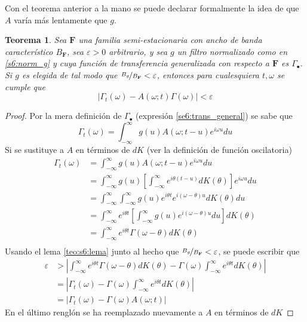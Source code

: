 \documentclass[12pt,letterpaper]{book}
\newtheorem{teorema}{Teorema}[chapter]
\newcommand{\intR}{\int_{-\infty}^{\infty}}
\newcommand{\ef}{\mathbf{F}}
\newcommand{\abso}[1]{\left| #1 \right|}
\begin{document}
Con el teorema anterior a la mano se puede declarar formalmente la idea de que $A$ varía más lentamente que $g$.

\begin{teorema}
Sea $\ef$ una familia semi-estacionaria con ancho de banda característico $B_\ef$, sea $\varepsilon >0$ arbitrario, y sea $g$ un filtro normalizado como en \ref{s6:norm_g} y cuya función de transferencia generalizada con respecto a $\ef$ es $\Gamma_\bullet$. 
%
Si $g$ es elegida de tal modo que $\nicefrac{B_g}{B_\ef} < \varepsilon$, entonces para cualesquiera $t, \omega$ se cumple que
\begin{equation}
\abso{\Gamma_t(\omega)- A(\omega; t)\Gamma(\omega)} < \varepsilon
\end{equation}
\label{teo:aprox_gamma} 
\end{teorema}

\begin{proof}
Por la mera definición de $\Gamma_\bullet$ (expresión \ref{se6:trans_general}) se sabe que
\begin{equation*}
\Gamma_t (\omega) = \intR g(u) A(\omega; t-u) e^{i \omega u} du
\end{equation*}
Si se sustituye a $A$ en términos de $dK$ (ver la definición de función oscilatoria)
\begin{align*}
\Gamma_t (\omega) &= \intR g(u) A(\omega; t-u) e^{i \omega u} du \\
&= 
\intR g(u) \left[ \intR e^{i \theta (t-u)} dK(\theta) \right] e^{i \omega u} du \\
&=
\intR \intR g(u) e^{i \theta t} e^{i (\omega- \theta) u} dK(\theta) du \\
&=
\intR e^{i \theta t} \left[ \intR g(u) e^{i (\omega- \theta) u} du \right] dK(\theta) \\
&=
\intR e^{i \theta t} \Gamma(\omega - \theta) dK(\theta) \\
\end{align*}
Usando el lema \ref{teo:s6:lema} junto al hecho que $\nicefrac{B_g}{B_\ef} < \varepsilon$, se puede escribir que
\begin{align*}
\varepsilon 
&> 
\abso{\intR e^{i \theta t} \Gamma(\omega - \theta) dK(\theta) - 
\Gamma(\omega) \intR e^{i \theta t} dK(\theta) } \\
&=
\abso{\Gamma_t (\omega) - 
\Gamma(\omega) \intR e^{i \theta t} dK(\theta) } \\
&=
\abso{\Gamma_t (\omega) - 
\Gamma(\omega) A(\omega; t) }
\end{align*}
En el último renglón se ha reemplazado nuevamente a $A$ en términos de $dK	$
\end{proof}
\end{document}
